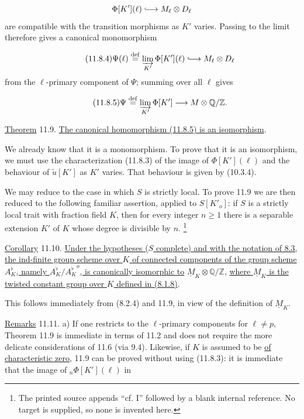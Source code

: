 \begin{equation*}
\Phi[K'](\ell)\lhook\joinrel\longrightarrow M_\ell\otimes D_\ell
\end{equation*}
are compatible with the transition morphisms as $K'$ varies. Passing to the
limit therefore gives a canonical monomorphism

\begin{equation}\tag{11.8.4}
\Psi(\ell)\mathrel{\mathop{=}^{\mathrm{def}}}
 \varinjlim_{K'}\Phi[K'](\ell)
 \lhook\joinrel\longrightarrow M_\ell\otimes D_\ell
\end{equation}
from the $\ell$-primary component of $\Psi$; summing over all $\ell$ gives

\begin{equation}\tag{11.8.5}
\Psi\mathrel{\mathop{=}^{\mathrm{def}}}
 \varinjlim_{K'}\Phi[K']
 \longrightarrow M\otimes\mathbb Q/\mathbb Z.
\end{equation}

\medskip
\noindent
\underline{Theorem} 11.9. \underline{The canonical homomorphism (11.8.5)
is an isomorphism}.

We already know that it is a monomorphism. To prove that it is an
isomorphism, we must use the characterization (11.8.3) of the image of
$\Phi[K'](\ell)$ and the behaviour of $\widetilde u[K']$ as $K'$ varies.
That behaviour is given by (10.3.4).

We may reduce to the case in which $S$ is strictly local. To prove 11.9 we
are then reduced to the following familiar assertion, applied to $S[K'_o]$:
if $S$ is a strictly local trait with fraction field $K$, then for every
integer $n\geq1$ there is a separable extension $K'$ of $K$ whose degree is
divisible by $n$.
\footnote{The printed source appends ``cf. I'' followed by a blank internal
reference. No target is supplied, so none is invented here.}

\medskip
\noindent
\underline{Corollary} 11.10. \underline{Under the hypotheses ($S$
complete) and with the notation of 8.3, the ind-finite group scheme over
$K$ of connected components of the group scheme $A_K^{\flat}$,
namely $A_K^{\flat}/{A_K^{\flat}}^o$, is canonically isomorphic to}
$\underline M_K\otimes\mathbb Q/\mathbb Z$, \underline{where
$\underline M_K$ is the twisted constant group over $K$ defined in
(8.1.8)}.

This follows immediately from (8.2.4) and 11.9, in view of the definition
of $\underline M_K$.

\medskip
\noindent
\underline{Remarks} 11.11. a) If one restricts to the $\ell$-primary
components for $\ell\neq p$, Theorem 11.9 is immediate in terms of 11.2 and
does not require the more delicate considerations of 11.6 (via 9.4).
Likewise, if $K$ is assumed to be \underline{of characteristic zero}, 11.9
can be proved without using (11.8.3): it is immediate that the image of
${}_n\Phi[K'](\ell)$ in

